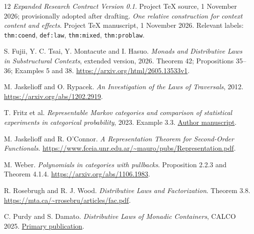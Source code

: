 \documentclass[11pt,a4paper]{article}
\begin{document}
\begin{thebibliography}{12}
\emph{Expanded Research Contract Version 0.1}.
Project TeX source, 1 November 2026; provisionally adopted after drafting.
\emph{One relative construction for context content and effects}.
Project TeX manuscript, 1 November 2026.
Relevant labels: \texttt{thm:coend}, \texttt{def:law},
\texttt{thm:mixed}, \texttt{thm:problaw}.

S. Fujii, Y. C. Tsai, Y. Montacute and I. Hasuo.
\emph{Monads and Distributive Laws in Substructural Contexts}, extended
version, 2026. Theorem 42; Propositions 35--36; Examples 5 and 38.
\url{https://arxiv.org/html/2605.13533v1}.

M. Jaskelioff and O. Rypacek.
\emph{An Investigation of the Laws of Traversals}, 2012.
\url{https://arxiv.org/abs/1202.2919}.

T. Fritz et al.
\emph{Representable Markov categories and comparison of statistical
experiments in categorical probability}, 2023. Example 3.3.
\href{https://pure.strath.ac.uk/ws/portalfiles/portal/163006824/Fritz_etal_TCS_2023_Representable_Markov_categories_and_comparison_of_statistical_experiments.pdf}{Author manuscript}.

M. Jaskelioff and R. O'Connor.
\emph{A Representation Theorem for Second-Order Functionals}.
\url{https://www.fceia.unr.edu.ar/~mauro/pubs/Representation.pdf}.

M. Weber. \emph{Polynomials in categories with pullbacks}.
Proposition 2.2.3 and Theorem 4.1.4.
\url{https://arxiv.org/abs/1106.1983}.

R. Rosebrugh and R. J. Wood.
\emph{Distributive Laws and Factorization}. Theorem 3.8.
\url{https://mta.ca/~rrosebru/articles/fac.pdf}.

C. Purdy and S. Damato.
\emph{Distributive Laws of Monadic Containers}, CALCO 2025.
\href{https://drops.dagstuhl.de/storage/00lipics/lipics-vol342-calco2025/html/LIPIcs.CALCO.2025.4/LIPIcs.CALCO.2025.4.html}{Primary publication}.
\end{thebibliography}
\end{document}
